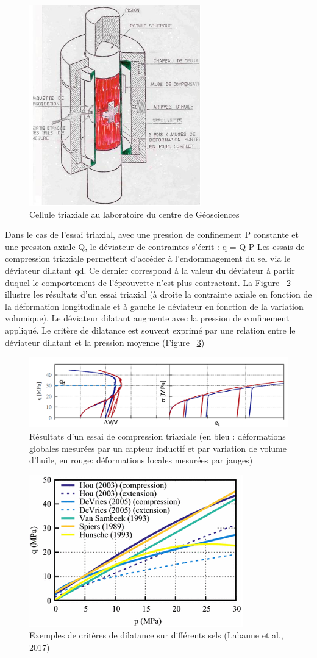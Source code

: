 \documentclass[11pt,french,a4paper]{article}
\begin{document}
\begin{figure}[h]
\centering
\includegraphics[width=.4\linewidth]{image/annexe/annexe_D/D6.png}
\caption{Cellule triaxiale au laboratoire du centre de Géosciences }
\label{fig:d6}
\end{figure}
\FloatBarrier

Dans le cas de l’essai triaxial, avec une pression de confinement P constante et une pression axiale Q, le déviateur de contraintes s’écrit : q = Q-P
Les essais de compression triaxiale permettent d'accéder à l'endommagement du sel via le déviateur dilatant qd. Ce dernier correspond à la valeur du déviateur à partir duquel le comportement de l'éprouvette n'est plus contractant. La Figure ~\ref{fig:d7} illustre les résultats d'un essai triaxial (à droite la contrainte axiale en fonction de la déformation longitudinale et à gauche le déviateur en fonction de la variation volumique). 
Le déviateur dilatant augmente avec la pression de confinement appliqué. Le critère de dilatance est souvent exprimé par une relation entre le déviateur dilatant et la pression moyenne (Figure ~\ref{fig:d8})

\begin{figure}[h]
\centering
\includegraphics[width=.4\linewidth]{image/annexe/annexe_D/D7.png}
\caption{Résultats d'un essai de compression triaxiale (en bleu : déformations globales mesurées par un capteur inductif et par variation de volume d'huile, en rouge: déformations locales mesurées par jauges)}
\label{fig:d7}
\end{figure}

\begin{figure}[h]
\centering
\includegraphics[width=.4\linewidth]{image/annexe/annexe_D/D8.png}
\caption{Exemples de critères de dilatance sur différents sels (Labaune et al., 2017)}
\label{fig:d8}
\end{figure}
\FloatBarrier
\end{document}
